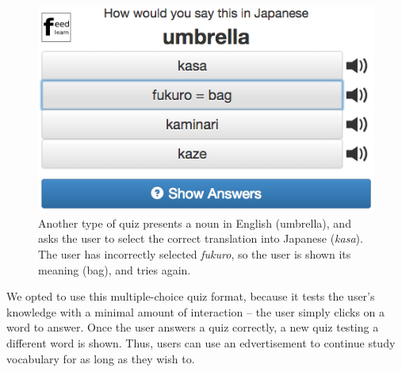\documentclass{sigchi}
\begin{document}
\begin{figure}
\centering
\includegraphics[width=1.0\columnwidth]{quiz2}
\caption{Another type of quiz presents a noun in English (umbrella), and asks the user to select the correct translation into Japanese (\textit{kasa}). The user has incorrectly selected \textit{fukuro}, so the user is shown its meaning (bag), and tries again.}
\label{fig:quiz2}
\end{figure}

We opted to use this multiple-choice quiz format, because it tests the user's knowledge with a minimal amount of interaction -- the user simply clicks on a word to answer. Once the user answers a quiz correctly, a new quiz testing a different word is shown. Thus, users can use an edvertisement to continue study vocabulary for as long as they wish to.


\end{document}
